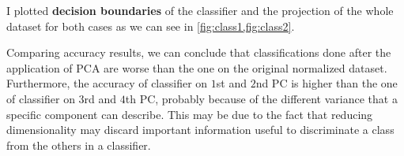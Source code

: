 \documentclass[a4paper, 11pt]{article}
\begin{document}
	I plotted \textbf{decision boundaries} of the classifier and the projection of the whole dataset for both cases as we can see in \vref{fig:class1,fig:class2}.
	
	
	Comparing accuracy results, we can conclude that classifications done after the application of PCA are worse than the one on the original normalized dataset. Furthermore, the accuracy of classifier on $1$st and $2$nd PC is higher than the one of classifier on $3$rd and $4$th PC, probably because of the different variance that a specific component can describe.
	This may be due to the fact that reducing dimensionality may discard important information useful to discriminate a class from the others in a classifier.
	
	
\end{document}
